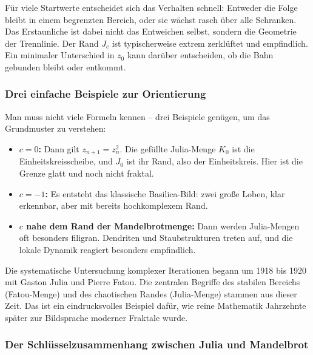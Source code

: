 Für viele Startwerte entscheidet sich das Verhalten schnell:
Entweder die Folge bleibt in einem begrenzten Bereich,
oder sie wächst rasch über alle Schranken.
Das Erstaunliche ist dabei nicht das Entweichen selbst,
sondern die Geometrie der Trennlinie.
Der Rand $J_c$ ist typischerweise extrem zerklüftet und empfindlich.
Ein minimaler Unterschied in $z_0$
kann darüber entscheiden,
ob die Bahn gebunden bleibt oder entkommt.

\subsubsection*{Drei einfache Beispiele zur Orientierung}

Man muss nicht viele Formeln kennen --
drei Beispiele genügen, um das Grundmuster zu verstehen:

\begin{itemize}
\item \textbf{$c=0$:} Dann gilt $z_{n+1}=z_n^2$.
Die gefüllte Julia-Menge $K_0$ ist die Einheitskreisscheibe,
und $J_0$ ist ihr Rand, also der Einheitskreis.
Hier ist die Grenze glatt und noch nicht fraktal.
\item \textbf{$c=-1$:} Es entsteht das klassische \glqq Basilica\grqq-Bild:
zwei große Loben, klar erkennbar,
aber mit bereits hochkomplexem Rand.
\item \textbf{$c$ nahe dem Rand der Mandelbrotmenge:} Dann werden Julia-Mengen oft besonders filigran.
Dendriten und Staubstrukturen treten auf,
und die lokale Dynamik reagiert besonders empfindlich.
\end{itemize}

\begin{HistoryBox}
\label{box:julia}
Die systematische Untersuchung komplexer Iterationen begann um 1918 bis 1920 mit Gaston Julia und Pierre Fatou.
Die zentralen Begriffe des stabilen Bereichs (Fatou-Menge) und des chaotischen Randes (Julia-Menge) stammen aus dieser Zeit.
Das ist ein eindrucksvolles Beispiel dafür,
wie reine Mathematik Jahrzehnte später zur Bildsprache moderner Fraktale wurde.
\end{HistoryBox}

\subsubsection*{Der Schlüsselzusammenhang zwischen Julia und Mandelbrot}

